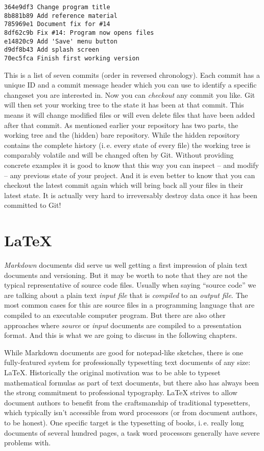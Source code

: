 \documentclass[../../LilyPond-Tutorials]{subfiles}
\begin{document}
\begin{lstlisting}[frame=single]
364e9df3 Change program title
8b881b89 Add reference material
785969e1 Document fix for #14
8df62c9b Fix #14: Program now opens files
e14820c9 Add 'Save' menu button
d9df8b43 Add splash screen
70ec5fca Finish first working version
\end{lstlisting}

This is a list of seven commits (order in reversed chronology).
Each commit has a unique ID and a commit message header which you can use to identify a specific changeset you are interested in.
Now you can \emph{checkout} any commit you like.
Git will then set your working tree to the state it has been at that commit.
This means it will change modified files or will even delete files that have been added after that commit.
As mentioned earlier your repository has two parts, the working tree and the (hidden) bare repository.
While the hidden repository contains the complete history (i.\,e. every state of every file) the working tree is comparably volatile and will be changed often by Git.
Without providing concrete examples it is good to know that this way you can inspect -- and modify -- any previous state of your project.
And it is even better to know that you can checkout the latest commit again which will bring back all your files in their latest state.
It is actually very hard to irreversably destroy data once it has been committed to Git!

\chapter{\LaTeX}
\emph{Markdown} documents did serve us well getting a first impression of plain text documents and versioning.
But it may be worth to note that they are not the typical representative of source code files.
Usually when saying “source code” we are talking about a plain text \emph{input file} that is \emph{compiled} to an \emph{output file}.
The most common cases for this are source files in a programming language that are compiled to an executable computer program.
But there are also other approaches where \emph{source} or \emph{input} documents are compiled to a presentation format.
And this is what we are going to discuss in the following chapters.

While Markdown documents are good for notepad-like sketches, there is one fully-featured system for professionally typesetting text documents of any size: \LaTeX.
Historically the original motivation was to be able to typeset mathematical formulas as part of text documents, but there also has always been the strong commitment to professional typography.
\LaTeX{} strives to allow document authors to benefit from the craftsmanship of traditional typesetters, which typically isn't accessible from word processors (or from document authors, to be honest).
One specific target is the typesetting of books, i.\,e. really long documents of several hundred pages, a task word processors generally have severe problems with.
\end{document}
